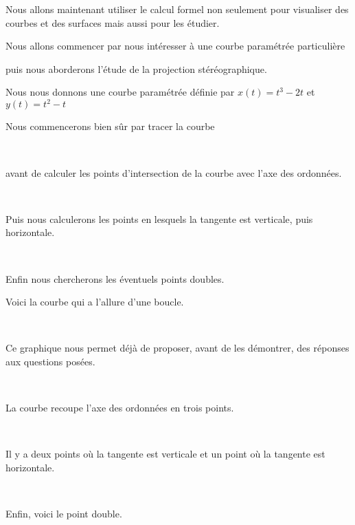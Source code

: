 

\newcommand{\vect}{\overrightarrow}
\newcommand{\Sage}{\texttt{Sage}}




\debuttexte


\diapo

Nous allons maintenant utiliser le calcul formel non seulement pour visualiser
des courbes et des surfaces mais aussi pour les étudier.

\change


\change
Nous allons commencer par nous intéresser à une courbe paramétrée particulière

\change
puis nous aborderons l'étude de la projection stéréographique.


\diapo

Nous nous donnons une courbe paramétrée définie par 
$  x(t) =  t^3-2t$
et $y(t) =  t^2-t$

Nous commencerons bien sûr par tracer la courbe

~

avant de calculer les points d'intersection de la courbe avec l'axe des ordonnées.

~

Puis nous calculerons les points en lesquels la tangente est verticale, puis horizontale.

~
  
Enfin nous chercherons les éventuels points doubles.


\diapo

Voici la courbe qui a l'allure d'une boucle. 

~

Ce graphique nous permet déjà de proposer, avant de les démontrer, des réponses aux questions posées. 

~


La courbe recoupe l'axe des ordonnées en trois points.

~


Il y a deux points où la tangente est verticale et un point où la tangente est horizontale.

~

Enfin, voici le point double.


